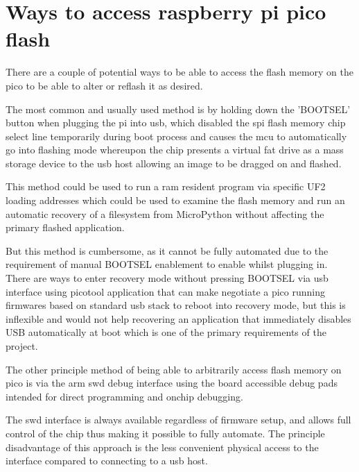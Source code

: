 \section{Ways to access raspberry pi pico flash}

There are a couple of potential ways to be able to access the flash memory on the pico to be able to alter or reflash it as desired.

The most common and usually used method is by holding down the 'BOOTSEL' button when plugging the pi into \gls{usb}, which disabled the \gls{spi} flash memory chip select line temporarily during boot process and causes the \gls{mcu} to automatically go into flashing mode whereupon the chip presents a virtual fat drive as a mass storage device to the \gls{usb} host allowing an image to be dragged on and flashed.

This method could be used to run a \gls{ram} resident program via specific UF2 loading addresses which could be used to examine the flash memory and run an automatic recovery of a filesystem from MicroPython without affecting the primary flashed application.

But this method is cumbersome, as it cannot be fully automated due to the requirement of manual BOOTSEL enablement to enable whilst plugging in. There are ways to enter recovery mode without pressing BOOTSEL via \gls{usb} interface using picotool application that can make negotiate a pico running firmwares based on standard \gls{usb} stack to reboot into recovery mode\cite{picotool}, but this is inflexible and would not help recovering an application that immediately disables USB automatically at boot which is one of the primary requirements of the project.

The other principle method of being able to arbitrarily access flash memory on pico is via the \gls{arm} \gls{swd} debug interface using the board accessible debug pads intended for direct programming and onchip debugging.

The \gls{swd} interface  is always available regardless of firmware setup, and allows full control of the chip thus making it possible to fully automate. The principle disadvantage of this approach is the less convenient physical access to the interface compared to connecting to a \gls{usb} host.
\pagebreak
